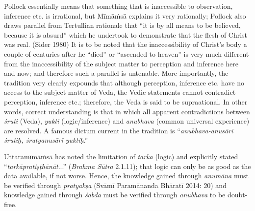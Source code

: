 Pollock essentially means that something that is inaccessible to observation, inference etc. is irrational, but {Mīmāṁsā} explains it very rationally; Pollock also draws parallel from Tertullian rationale that “it is by all means to be believed, because it is absurd” which he undertook to demonstrate that the flesh of Christ was real. (Sider 1980) It is to be noted that the inaccessibility of Christ’s body a couple of centuries after he “died” or “ascended to heaven” is very much different from the inaccessibility of the subject matter to perception and inference here and now; and therefore such a parallel is untenable. More importantly, the tradition very clearly expounds that although perception, inference etc. have no access to the subject matter of Veda, the Vedic statements cannot contradict perception, inference etc.; therefore, the Veda is said to be supraational. In other words, correct understanding is that in which all apparent contradictions between \textit{śruti} (Veda), \textit{yukti }(logic/inference) and \textit{anubhava} (common universal experience) are resolved. A famous dictum current in the tradition is “\textit{anubhava-anusārī śrutiḥ, śrutyanusārī yuktiḥ}.”

Uttaramīmāṁsā has noted the limitation of \textit{tarka} (logic) and explicitly stated “\textit{tarkāpratiṣṭhānāt}...” (\textit{Brahma Sūtra} 2.1.11); that logic can only be as good as the data available, if not worse. Hence, the knowledge gained through \textit{anumāna} must be verified through \textit{pratyakṣa} (Svāmī Paramānanda Bhāratī 2014: 20) and knowledge gained through \textit{śabda} must be verified through \textit{anubhava} to be doubt-free.


